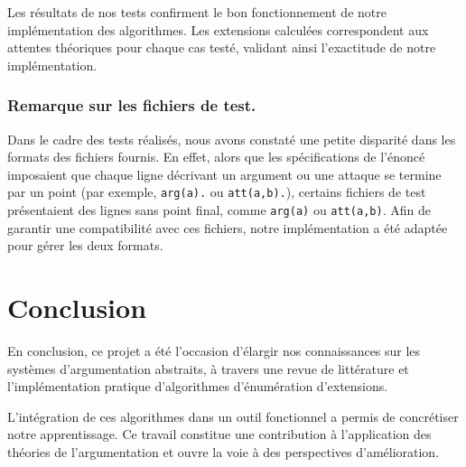 \documentclass{rapportECL}
\begin{document}
\vspace{0.5cm}
\noindent

Les résultats de nos tests confirment le bon fonctionnement de notre implémentation des algorithmes. Les extensions calculées correspondent aux attentes théoriques pour chaque cas testé, validant ainsi l'exactitude de notre implémentation.

\subsubsection{Remarque sur les fichiers de test.} 
Dans le cadre des tests réalisés, nous avons constaté une petite disparité dans les formats des fichiers fournis. En effet, alors que les spécifications de l'énoncé imposaient que chaque ligne décrivant un argument ou une attaque se termine par un point (par exemple, \texttt{arg(a).} ou \texttt{att(a,b).}), certains fichiers de test présentaient des lignes sans point final, comme \texttt{arg(a)} ou \texttt{att(a,b)}. Afin de garantir une compatibilité avec ces fichiers, notre implémentation a été adaptée pour gérer les deux formats. 


\section{Conclusion}
En conclusion, ce projet a été l'occasion d'élargir nos connaissances sur les systèmes d'argumentation abstraits, 
à travers une revue de littérature et l'implémentation pratique d'algorithmes d'énumération d'extensions. 

L'intégration de ces algorithmes dans un outil fonctionnel a permis de concrétiser notre apprentissage. 
Ce travail constitue une contribution à l'application des théories de l'argumentation et ouvre la voie à des perspectives d'amélioration.



 

\end{document}

